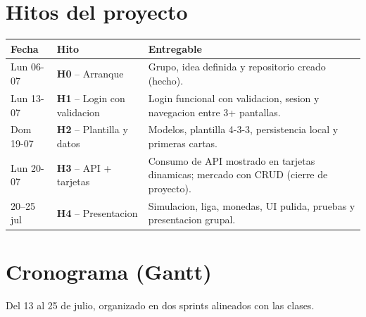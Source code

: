 \documentclass[11pt,a4paper]{article}
\begin{document}
\section{Hitos del proyecto}
\renewcommand{\arraystretch}{1.35}
\begin{tabularx}{\textwidth}{@{}C{2.4cm} L{4.6cm} X@{}}
\toprule
\textbf{Fecha} & \textbf{Hito} & \textbf{Entregable} \\
\midrule
Lun 06-07 & \textbf{H0} -- Arranque & Grupo, idea definida y repositorio creado (hecho). \\
Lun 13-07 & \textbf{H1} -- Login con validacion & Login funcional con validacion, sesion y navegacion entre 3+ pantallas. \\
Dom 19-07 & \textbf{H2} -- Plantilla y datos & Modelos, plantilla 4-3-3, persistencia local y primeras cartas. \\
Lun 20-07 & \textbf{H3} -- API + tarjetas & Consumo de API mostrado en tarjetas dinamicas; mercado con CRUD (cierre de proyecto). \\
20--25 jul & \textbf{H4} -- Presentacion & Simulacion, liga, monedas, UI pulida, pruebas y presentacion grupal. \\
\bottomrule
\end{tabularx}

\section{Cronograma (Gantt)}
Del 13 al 25 de julio, organizado en dos sprints alineados con las clases.
\end{document}
